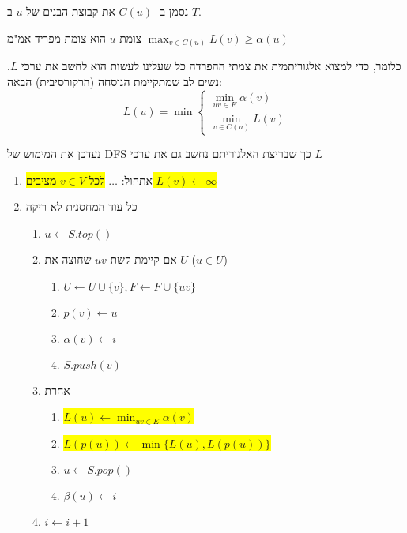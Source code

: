 נסמן ב-%
$C(u)$
את קבוצת הבנים של $u$ ב-$T$.
\begin{observation}
צומת $u$ הוא צומת מפריד אמ"מ 
$\displaystyle\max_{v \in C(u)} L(v) \ge \alpha(u)$
\end{observation}

כלומר, כדי למצוא אלגוריתמית את צמתי ההפרדה כל שעלינו לעשות הוא לחשב את ערכי $L$.
נשים לב  שמתקיימת הנוסחה (הרקורסיבית) הבאה:
$$
L(u) = \min
\begin{cases}
\displaystyle\min_{uv \in E} \alpha(v)
\\
\displaystyle\min_{v \in C(u)} L(v)
\end{cases}
$$




\newpage
נעדכן את המימוש של DFS כך שבריצת האלגוריתם נחשב גם את ערכי $L$
\begin{enumerate}
\item
אתחול:
$\ldots$
\colorbox{yellow}{
לכל 
$v \in V$
מציבים
$L(v) \leftarrow \infty$
}
\item
כל עוד המחסנית לא ריקה
\begin{enumerate}
	\item
	$u \leftarrow S.top()$
	\item 
	אם קיימת קשת 
	$uv$
	שחוצה את $U$ 
	($u \in U$)
		\begin{enumerate}
		\item
		$U \leftarrow U \cup \{v\}, F \leftarrow F \cup \{uv\}$
		\item
		$p(v) \leftarrow u$
		\item
		$\alpha(v) \leftarrow i$
		\item
		$S.push(v)$
		\end{enumerate}
	\item
	אחרת 
	\begin{enumerate}
		\item 
		\colorbox{yellow}{$L(u) \leftarrow \displaystyle\min_{uv \in E} \alpha(v)$}
		\item \colorbox{yellow}{$L(p(u)) \leftarrow \min\{L(u), L(p(u))\}$}
		\item $u \leftarrow S.pop()$
		\item $\beta(u) \leftarrow i$
	\end{enumerate}
	\item
	$i \leftarrow i + 1$
	\end{enumerate}
\end{enumerate}

